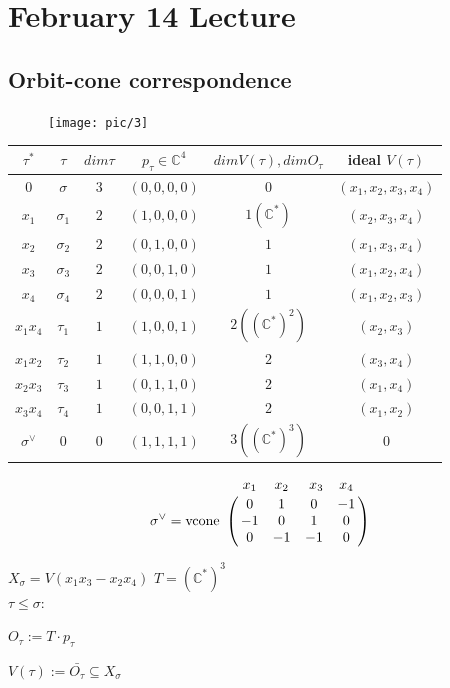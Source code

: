 \documentclass[a4paper,12pt]{amsart}
\newcommand{\C}{\ensuremath{\mathbb{C}}}
\begin{document}
\newpage
\section{February 14 Lecture}
\subsection{Orbit-cone correspondence}
\begin{figure}[h]
	\centering
	\texttt{[image: pic/3]}
\end{figure}

\begin{center}
	\begin{tabular}{ |c|c|c|c|c|c|} 
		\hline
		$\tau^*$ & $\tau$ & $dim\tau$ & $p_\tau \in \C^4$ & $dim V(\tau), dim O_\tau$ & ideal $V(\tau)$ \\
		\hline
		$0$ & $\sigma$ & $3$ & $(0,0,0,0)$ & $0$ & $(x_1,x_2,x_3,x_4)$ \\ 
		$x_1$ & $\sigma_1$ & $2$ & $(1,0,0,0)$ & $1 (\C^*)$ & $(x_2,x_3,x_4)$ \\
		$x_2$ & $\sigma_2$ & $2$ & $(0,1,0,0)$ & $1 $ & $(x_1,x_3,x_4)$ \\
		$x_3$ & $\sigma_3$ & $2$ & $(0,0,1,0)$ & $1 $ & $(x_1,x_2,x_4)$ \\
		$x_4$ & $\sigma_4$ & $2$ & $(0,0,0,1)$ & $1 $ & $(x_1,x_2,x_3)$ \\
		$x_1x_4$ & $\tau_1$ & $1$ & $(1,0,0,1)$ & $ 2 ((\C^*)^2) $ & $(x_2,x_3)$ \\
		$x_1x_2$ & $\tau_2$ & $1$ & $(1,1,0,0)$ & $2 $ & $(x_3,x_4)$ \\
		$x_2x_3$ & $\tau_3$ & $1$ & $(0,1,1,0)$ & $2 $ & $(x_1,x_4)$ \\
		$x_3x_4$ & $\tau_4$ & $1$ & $(0,0,1,1)$ & $2 $ & $(x_1,x_2)$ \\
		$\sigma^\vee$ & $0$ & $0$ & $(1,1,1,1)$ & $3 ((\C^*)^3) $ & $0$ \\
		\hline
	\end{tabular}
\end{center}


$$\sigma^\vee=\text{vcone}\bordermatrix{& x_1 & x_2 &\ x_3 & x_4 \cr
	& 0 &  1  & 0 & -1 \cr
	& -1  &  0 & 1 & 0 \cr
	& 0 & -1 & -1 & 0 }$$

$X_\sigma=V(x_1x_3-x_2x_4)$
$T=(\C^*)^3$
\\

$\tau\leq \sigma$:

$O_\tau:=T\cdot p_\tau$

$V(\tau):= \bar{O_\tau}\subseteq X_\sigma$ 
\end{document}

